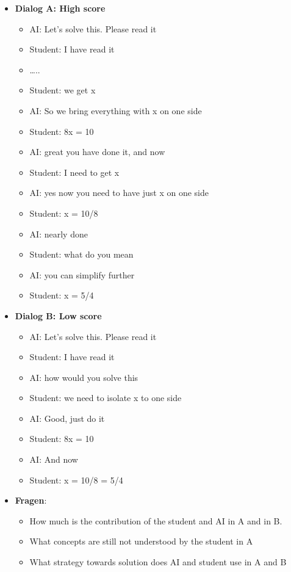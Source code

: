\documentclass[
  letterpaper,
  DIV=11,
  numbers=noendperiod]{scrartcl}
\providecommand{\tightlist}{%
  \setlength{\itemsep}{0pt}\setlength{\parskip}{0pt}}\usepackage{longtable,booktabs,array}
\begin{document}
\begin{itemize}
\tightlist
\item
  \textbf{Dialog A: High score}

  \begin{itemize}
  \tightlist
  \item
    AI: Let's solve this. Please read it
  \item
    Student: I have read it
  \item
    \ldots..
  \item
    Student: we get x
  \item
    AI: {So we bring everything with x on one side}
  \item
    Student: {8x = 10}
  \item
    AI: great you have done it, and now
  \item
    Student: I need to get x
  \item
    AI: {yes now you need to have just x on one side}
  \item
    Student: {x = 10/8}
  \item
    AI: nearly done
  \item
    Student: what do you mean
  \item
    AI: {you can simplify further}
  \item
    Student: {x = 5/4}
  \end{itemize}
\end{itemize}

\begin{itemize}
\tightlist
\item
  \textbf{Dialog B: Low score}

  \begin{itemize}
  \tightlist
  \item
    AI: Let's solve this. Please read it
  \item
    Student: I have read it
  \item
    AI: how would you solve this
  \item
    Student: {we need to isolate x to one side}
  \item
    AI: Good, just do it
  \item
    Student: {8x = 10}
  \item
    AI: And now
  \item
    Student: {x = 10/8 = 5/4}
  \end{itemize}
\item
  \textbf{Fragen}:

  \begin{itemize}
  \tightlist
  \item
    How much is the contribution of the student and AI in A and in B.
  \item
    What concepts are still not understood by the student in A
  \item
    What strategy towards solution does AI and student use in A and B
  \end{itemize}
\end{itemize}
\end{document}
